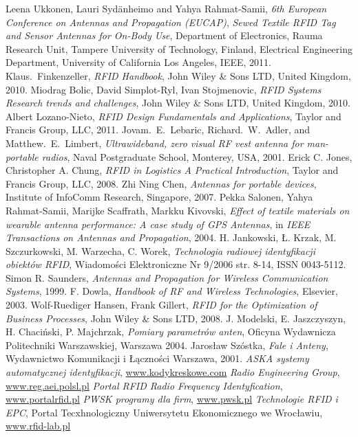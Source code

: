 \begin{thebibliography}{99}

%
Leena Ukkonen, Lauri Syd\"anheimo and Yahya Rahmat-Samii, \emph{6th European Conference on Antennas and Propagation (EUCAP)}, \emph{Sewed Textile RFID Tag and Sensor Antennas for On-Body Use}, Department of Electronics, Rauma Research Unit, Tampere University of Technology, Finland, Electrical Engineering Department, University of California Los Angeles, IEEE, 2011.
%
Klaus.~Finkenzeller, \emph{RFID Handbook}, John Wiley \& Sons LTD, United Kingdom, 2010.
%
Miodrag Bolic, David Simplot-Ryl, Ivan Stojmenovic, \emph{RFID Systems Research trends and challenges}, John Wiley \& Sons LTD, United Kingdom, 2010.
%
Albert Lozano-Nieto, \emph{RFID Design Fundamentals and Applications}, Taylor and Francis Group, LLC, 2011.
%
Jovam.~E.~Lebaric, Richard.~W.~Adler, and Matthew.~E.~Limbert, \emph{Ultrawideband, zero visual RF vest antenna for man-portable radios}, Naval Postgraduate School, Monterey, USA, 2001. 
%
Erick C. Jones, Christopher A. Chung, \emph{RFID in Logistics A Practical Introduction}, Taylor and Francis Group, LLC, 2008. 
%
Zhi Ning Chen, \emph{Antennas for portable devices}, Institute of InfoComm Research, Singapore, 2007.
%
Pekka Salonen, Yahya Rahmat-Samii, Marijke Scaffrath, Markku Kivovski, \emph{Effect of textile materials on wearable antenna performance: A case study of GPS Antennas}, in \emph{IEEE Transactions on Antennas and Propagation}, 2004.
%
H. Jankowski, Ł. Krzak, M. Szczurkowski, M. Warzecha, C. Worek, \emph{Technologia radiowej identyfikacji obiektów RFID}, Wiadomości Elektroniczne Nr 9/2006 str. 8-14, ISSN 0043-5112.
%
Simon R. Saunders, \emph{Antennas and Propagation for Wireless Communication Systems}, 1999. 
%
F. Dowla, \emph{Handbook of RF and Wireless Technologies}, Elsevier, 2003.
%
Wolf-Ruediger Hansen, Frank Gillert, \emph{RFID for the Optimization of Business Processes}, John Wiley \& Sons LTD, 2008.
%
J. Modelski, E. Jaszczyszyn, H. Chaciński, P. Majchrzak, \emph{Pomiary parametrów anten}, Oficyna Wydawnicza Politechniki Warszawskiej, Warszawa 2004.  
%
Jarosław Szóstka, \emph{Fale i Anteny}, Wydawnictwo Komunikacji i Łączności Warszawa, 
2001.
%
\emph{ASKA systemy automatycznej identyfikacji}, \url{www.kodykreskowe.com}
%
\emph{Radio Engineering Group}, \url{www.reg.aei.polsl.pl}
%
\emph{Portal RFID Radio Frequency Identyfication}, \url{www.portalrfid.pl}
%
\emph{PWSK programy dla firm}, \url{www.pwsk.pl}
%
\emph{Technologie RFID i EPC}, Portal Tecxhnologiczny Uniwersytetu Ekonomicznego we Wrocławiu, \url{www.rfid-lab.pl}
\end{thebibliography}

